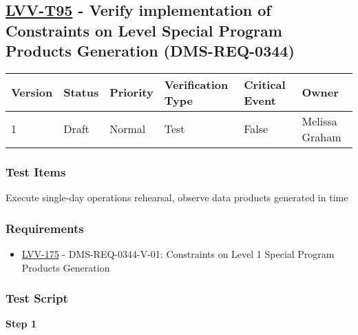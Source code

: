 \hypertarget{lvv-t95---verify-implementation-of-constraints-on-level-special-program-products-generation-dms-req-0344}{%
\subsection{\texorpdfstring{\href{https://jira.lsstcorp.org/secure/Tests.jspa\#/testCase/LVV-T95}{LVV-T95}
- Verify implementation of Constraints on Level Special Program Products
Generation
(DMS-REQ-0344)}{LVV-T95 - Verify implementation of Constraints on Level Special Program Products Generation (DMS-REQ-0344)}}\label{lvv-t95---verify-implementation-of-constraints-on-level-special-program-products-generation-dms-req-0344}}

\begin{longtable}[]{@{}llllll@{}}
\toprule
Version & Status & Priority & Verification Type & Critical Event &
Owner\tabularnewline
\midrule
\endhead
1 & Draft & Normal & Test & False & Melissa Graham\tabularnewline
\bottomrule
\end{longtable}

\hypertarget{test-items-71}{%
\subsubsection{Test Items}\label{test-items-71}}

Execute single-day operations rehearsal, observe data products generated
in time

\hypertarget{requirements-72}{%
\subsubsection{Requirements}\label{requirements-72}}

\begin{itemize}
\tightlist
\item
  \href{https://jira.lsstcorp.org/browse/LVV-175}{LVV-175} -
  DMS-REQ-0344-V-01: Constraints on Level 1 Special Program Products
  Generation
\end{itemize}

\hypertarget{test-script-72}{%
\subsubsection{Test Script}\label{test-script-72}}

\textbf{Step 1}\\
~\\
~\\

